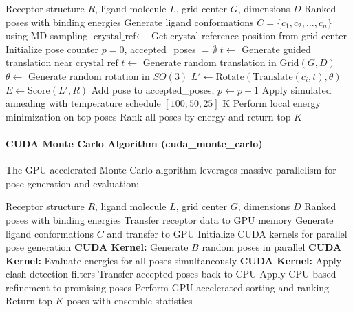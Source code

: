 \documentclass[11pt,a4paper]{article}
\begin{document}
\begin{algorithm}[H]
\caption{Monte Carlo CPU Docking}
\begin{algorithmic}[1]
\Require Receptor structure $R$, ligand molecule $L$, grid center $G$, dimensions $D$
\Ensure Ranked poses with binding energies
\State Generate ligand conformations $C = \{c_1, c_2, \ldots, c_n\}$ using MD sampling
\State $\text{crystal\_ref} \leftarrow$ Get crystal reference position from grid center
    \State Initialize pose counter $p = 0$, accepted\_poses $= \emptyset$
         
            \State $t \leftarrow$ Generate guided translation near $\text{crystal\_ref}$
        \Else
            \State $t \leftarrow$ Generate random translation in $\text{Grid}(G, D)$
        \EndIf
        \State $\theta \leftarrow$ Generate random rotation in $SO(3)$
        \State $L' \leftarrow \text{Rotate}(\text{Translate}(c_i, t), \theta)$
            \State $E \leftarrow \text{Score}(L', R)$
                \State Add pose to accepted\_poses, $p \gets p + 1$
            \EndIf
        \EndIf
    \EndWhile
    \State Apply simulated annealing with temperature schedule $[100, 50, 25]$ K
    \State Perform local energy minimization on top poses
\EndFor
\State Rank all poses by energy and return top $K$
\end{algorithmic}
\end{algorithm}

\paragraph{CUDA Monte Carlo Algorithm (cuda\_monte\_carlo)}

The GPU-accelerated Monte Carlo algorithm leverages massive parallelism for pose generation and evaluation:

\begin{algorithm}[H]
\caption{CUDA Monte Carlo Docking}
\begin{algorithmic}[1]
\Require Receptor structure $R$, ligand molecule $L$, grid center $G$, dimensions $D$
\Ensure Ranked poses with binding energies
\State Transfer receptor data to GPU memory
\State Generate ligand conformations $C$ and transfer to GPU
\State Initialize CUDA kernels for parallel pose generation
    \State \textbf{CUDA Kernel:} Generate $B$ random poses in parallel
    \State \textbf{CUDA Kernel:} Evaluate energies for all poses simultaneously
    \State \textbf{CUDA Kernel:} Apply clash detection filters
    \State Transfer accepted poses back to CPU
    \State Apply CPU-based refinement to promising poses
\EndFor
\State Perform GPU-accelerated sorting and ranking
\State Return top $K$ poses with ensemble statistics
\end{algorithmic}
\end{algorithm}
\end{document}
